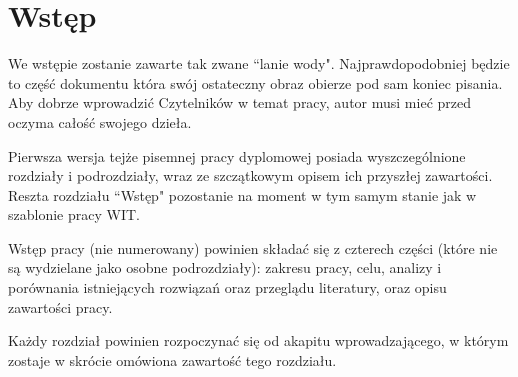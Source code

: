 \chapter*{Wstęp}

\thispagestyle{chapterBeginStyle}

{\color{dgray}
We wstępie zostanie zawarte tak zwane ``lanie wody". Najprawdopodobniej będzie to część dokumentu która swój ostateczny obraz obierze pod sam koniec pisania. Aby dobrze wprowadzić Czytelników w temat pracy, autor musi mieć przed oczyma całość swojego dzieła.

Pierwsza wersja tejże pisemnej pracy dyplomowej posiada wyszczególnione rozdziały i podrozdziały, wraz ze szczątkowym opisem ich przyszłej zawartości. Reszta rozdziału ``Wstęp" pozostanie na moment w tym samym stanie jak w szablonie pracy WIT.

Wstęp pracy (nie numerowany) powinien składać się z czterech części (które nie są wydzielane jako osobne podrozdziały): zakresu pracy, celu, analizy i porównania istniejących rozwiązań oraz przeglądu literatury, oraz opisu zawartości pracy.

Każdy rozdział powinien rozpoczynać się od akapitu wprowadzającego, w którym zostaje w skrócie omówiona zawartość tego rozdziału.
}





